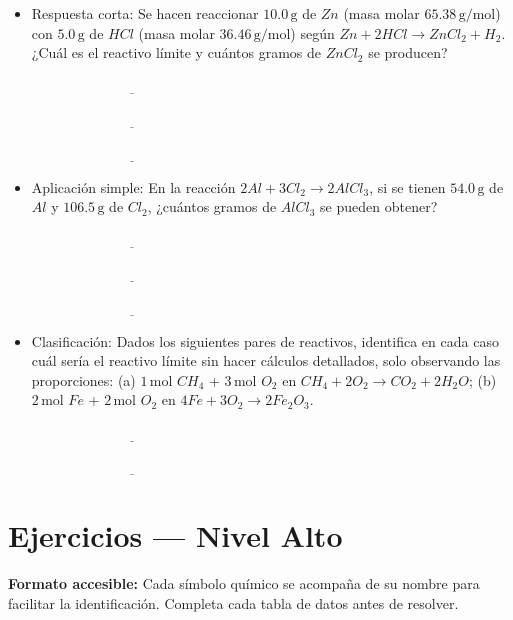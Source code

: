 \documentclass[
  spanish,
  letterpaper,
  12pt,
  oneside,
  open=any]{scrbook}
\newcommand{\setcolorsection}[2]{%
  \definecolor{currentsectionbg}{HTML}{#1}%
  \definecolor{currentsectionborder}{HTML}{#2}%
}
\begin{document}
\begin{itemize}
\item
  Respuesta corta: Se hacen reaccionar \(10.0\,\text{g}\) de \(Zn\)
  (masa molar \(65.38\,\text{g/mol}\)) con \(5.0\,\text{g}\) de \(HCl\)
  (masa molar \(36.46\,\text{g/mol}\)) según
  \(Zn + 2HCl \rightarrow ZnCl_2 + H_2\). ¿Cuál es el reactivo límite y
  cuántos gramos de \(ZnCl_2\) se producen?

  \(\underline{\hspace{6cm}}\)

  \(\underline{\hspace{6cm}}\)

  \(\underline{\hspace{6cm}}\)
\item
  Aplicación simple: En la reacción \(2Al + 3Cl_2 \rightarrow 2AlCl_3\),
  si se tienen \(54.0\,\text{g}\) de \(Al\) y \(106.5\,\text{g}\) de
  \(Cl_2\), ¿cuántos gramos de \(AlCl_3\) se pueden obtener?

  \(\underline{\hspace{6cm}}\)

  \(\underline{\hspace{6cm}}\)

  \(\underline{\hspace{6cm}}\)
\item
  Clasificación: Dados los siguientes pares de reactivos, identifica en
  cada caso cuál sería el reactivo límite sin hacer cálculos detallados,
  solo observando las proporciones: (a) \(1\,\text{mol}\) \(CH_4\) +
  \(3\,\text{mol}\) \(O_2\) en \(CH_4 + 2O_2 \rightarrow CO_2 + 2H_2O\);
  (b) \(2\,\text{mol}\) \(Fe\) + \(2\,\text{mol}\) \(O_2\) en
  \(4Fe + 3O_2 \rightarrow 2Fe_2O_3\).

  \(\underline{\hspace{6cm}}\)

  \(\underline{\hspace{6cm}}\)
\end{itemize}

\setcolorsection{b2e0d8}{98ccc4}

\section{Ejercicios --- Nivel Alto}\label{ejercicios-nivel-alto}

\textbf{Formato accesible:} Cada símbolo químico se acompaña de su
nombre para facilitar la identificación. Completa cada tabla de datos
antes de resolver.
\end{document}
